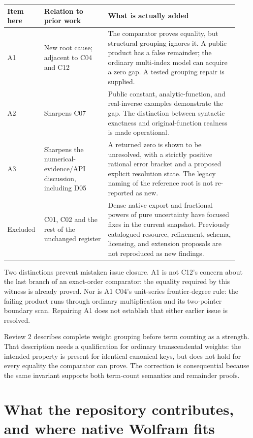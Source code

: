 \documentclass[11pt,letterpaper]{article}
\begin{document}
\begin{longtable}{@{}p{0.14\linewidth}p{0.26\linewidth}p{0.53\linewidth}@{}}
\toprule
Item here & Relation to prior work & What is actually added\\\midrule
\endhead
A1 & New root cause; adjacent to C04 and C12 & The comparator proves equality, but structural grouping ignores it. A public product has a false remainder; the ordinary multi-index model can acquire a zero gap. A tested grouping repair is supplied.\\[5pt]
A2 & Sharpens C07 & Public constant, analytic-function, and real-inverse examples demonstrate the gap. The distinction between syntactic exactness and original-function realness is made operational.\\[5pt]
A3 & Sharpens the numerical-evidence/API discussion, including D05 & A returned zero is shown to be unresolved, with a strictly positive rational error bracket and a proposed explicit resolution state. The legacy naming of the reference root is not re-reported as new.\\[5pt]
Excluded & C01, C02 and the rest of the unchanged register & Dense native export and fractional powers of pure uncertainty have focused fixes in the current snapshot. Previously catalogued resource, refinement, schema, licensing, and extension proposals are not reproduced as new findings.\\
\bottomrule
\end{longtable}

Two distinctions prevent mistaken issue closure. A1 is not C12's concern about the last branch of an exact-order comparator: the equality required by this witness is already proved. Nor is A1 C04's unit-series frontier-degree rule: the failing product runs through ordinary multiplication and its two-pointer boundary scan. Repairing A1 does not establish that either earlier issue is resolved.\cite{core,status}

Review 2 describes complete weight grouping before term counting as a strength. That description needs a qualification for ordinary transcendental weights: the intended property is present for identical canonical keys, but does not hold for every equality the comparator can prove. The correction is consequential because the same invariant supports both term-count semantics and remainder proofs.\cite{review2,core}

\section{What the repository contributes, and where native Wolfram fits}
\end{document}
